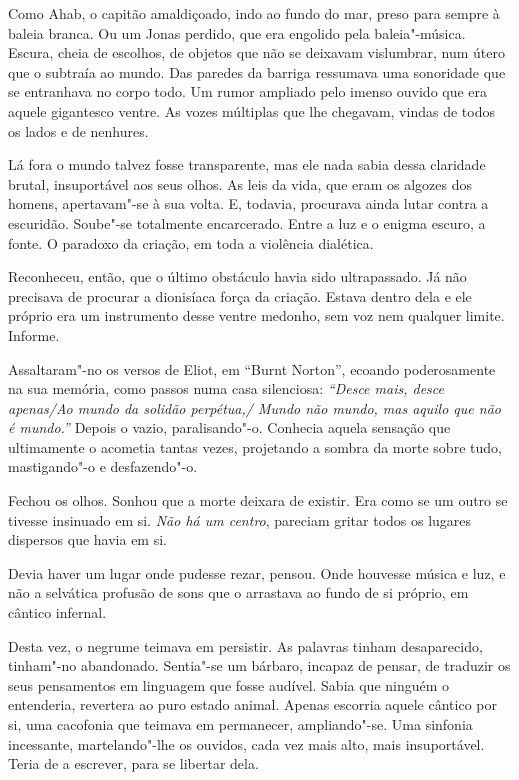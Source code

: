Como Ahab, o capitão amaldiçoado, indo ao fundo do mar, preso para
sempre à baleia branca. Ou um Jonas perdido, que era engolido pela
baleia"-música. Escura, cheia de escolhos, de objetos que não se
deixavam vislumbrar, num útero que o subtraía ao mundo. Das paredes da
barriga ressumava uma sonoridade que se entranhava no corpo todo. Um
rumor ampliado pelo imenso ouvido que era aquele gigantesco ventre. As
vozes múltiplas que lhe chegavam, vindas de todos os lados e de
nenhures.

Lá fora o mundo talvez fosse transparente, mas ele nada sabia dessa
claridade brutal, insuportável aos seus olhos. As leis da vida, que eram
os algozes dos homens, apertavam"-se à sua volta. E, todavia, procurava
ainda lutar contra a escuridão. Soube"-se totalmente encarcerado. Entre a
luz e o enigma escuro, a fonte. O paradoxo da criação, em toda a
violência dialética.

Reconheceu, então, que o último obstáculo havia sido ultrapassado. Já
não precisava de procurar a dionisíaca força da criação. Estava dentro
dela e ele próprio era um instrumento desse ventre medonho, sem voz nem
qualquer limite. Informe.

Assaltaram"-no os versos de Eliot, em ``Burnt Norton'', ecoando
poderosamente na sua memória, como passos numa casa silenciosa:\emph{
``Desce mais, desce apenas/Ao mundo da solidão perpétua,/ Mundo não
mundo, mas aquilo que não é mundo.''} Depois o vazio, paralisando"-o.
Conhecia aquela sensação que ultimamente o acometia tantas vezes,
projetando a sombra da morte sobre tudo, mastigando"-o e desfazendo"-o.

Fechou os olhos. Sonhou que a morte deixara de existir. Era como se um
outro se tivesse insinuado em si. \emph{Não há um centro}, pareciam gritar
todos os lugares dispersos que havia em si.

Devia haver um lugar onde pudesse rezar, pensou. Onde houvesse música e
luz, e não a selvática profusão de sons que o arrastava ao fundo de si
próprio, em cântico infernal.

Desta vez, o negrume teimava em persistir. As palavras tinham
desaparecido, tinham"-no abandonado. Sentia"-se um bárbaro, incapaz de
pensar, de traduzir os seus pensamentos em linguagem que fosse audível.
Sabia que ninguém o entenderia, revertera ao puro estado animal. Apenas
escorria aquele cântico por si, uma cacofonia que teimava em permanecer,
ampliando"-se. Uma sinfonia incessante, martelando"-lhe os ouvidos, cada
vez mais alto, mais insuportável. Teria de a escrever, para se libertar
dela.

